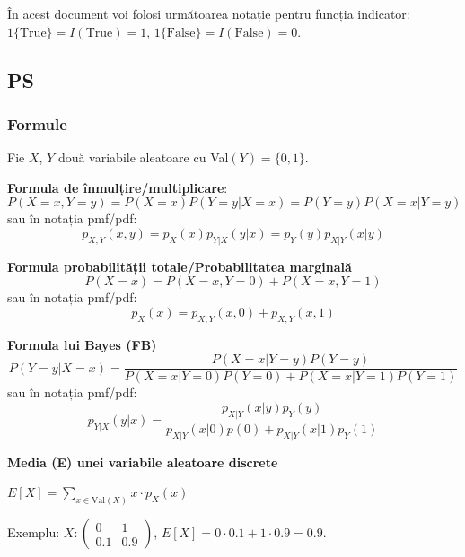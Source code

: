 \documentclass[12pt]{article}
\begin{document}
	În acest document voi folosi următoarea notație pentru funcția indicator: $1\{\text{True}\}=I(\text{True})=1$, $1\{\text{False}\}=I(\text{False})=0$.
	
	\subsection{PS}
	
	\subsubsection{Formule}
	Fie $X$, $Y$ două variabile aleatoare cu Val$(Y)=\{0,1\}$.
	
	\noindent \textbf{Formula de înmulțire/multiplicare}: 
	$$P(X=x,Y=y) = P(X=x)P(Y=y|X=x) = P(Y=y)P(X=x|Y=y)$$ 
	sau în notația pmf/pdf:
	$$p_{X,Y}(x,y) = p_X(x)p_{Y|X}(y|x) = p_Y(y)p_{X|Y}(x|y)$$
	
	\noindent \textbf{Formula probabilității totale/Probabilitatea marginală}
	$$P(X=x) = P(X=x,Y=0) + P(X=x,Y=1)$$
	sau în notația pmf/pdf:
	$$p_{X}(x) = p_{X,Y}(x,0)+p_{X,Y}(x,1)$$
	
	\noindent \textbf{Formula lui Bayes (FB)}
	$$P(Y=y|X=x) = \dfrac{P(X=x|Y=y)P(Y=y)}{P(X=x|Y=0)P(Y=0) + P(X=x|Y=1)P(Y=1)}$$
	sau în notația pmf/pdf:
	$$p_{Y|X}(y|x) = \dfrac{p_{X|Y}(x|y)p_Y(y)}{p_{X|Y}(x|0)p(0) + p_{X|Y}(x|1)p_Y(1)}$$
	
	\noindent\textbf{Media (E) unei variabile aleatoare discrete}
	
	$E[X] = \sum_{x \in \text{Val}(X)} x \cdot p_X(x)$
	
	Exemplu: $X:\begin{pmatrix}
	0 & 1\\
	0.1 & 0.9
	\end{pmatrix}$, $E[X] = 0 \cdot 0.1 + 1\cdot 0.9 = 0.9$.
	
\end{document}
